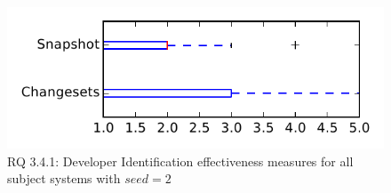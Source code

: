 
\begin{figure}
\centering
\includegraphics[height=0.4\textheight]{figures/dit_seed/rq1_tiny_2}
\caption{RQ 3.4.1: Developer Identification effectiveness measures for all subject systems with $seed=2$}
\label{fig:dit_seed:rq1:tiny}
\end{figure}
